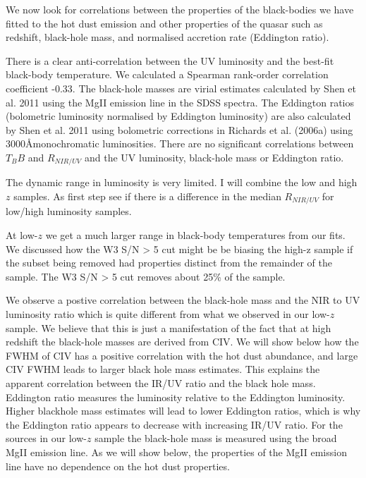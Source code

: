 We now look for correlations between the properties of the black-bodies we have fitted to the hot dust emission and other properties of the quasar such as redshift, black-hole mass, and normalised accretion rate (Eddington ratio). 

There is a clear anti-correlation between the UV luminosity and the best-fit black-body temperature. 
We calculated a Spearman rank-order correlation coefficient -0.33. 
The black-hole masses are virial estimates calculated by Shen et al. 2011 using the MgII emission line in the SDSS spectra. 
The Eddington ratios (bolometric luminosity normalised by Eddington luminosity) are also calculated by Shen et al. 2011 using bolometric corrections in Richards et al. (2006a) using 3000\AA monochromatic luminosities. 
There are no significant correlations between $T_BB$ and $R_{NIR/UV}$ and the UV luminosity, black-hole mass or Eddington ratio. 

The dynamic range in luminosity is very limited. 
I will combine the low and high $z$ samples. 
As first step see if there is a difference in the median $R_{NIR/UV}$ for low/high luminosity samples. 

At low-$z$  we get a much larger range in black-body temperatures from our fits. 
We discussed how the W3 S/N > 5 cut might be be biasing the high-z sample if the subset being removed had properties distinct from the remainder of the sample. 
The W3 S/N > 5 cut removes about 25\% of the sample. 

We observe a postive correlation between the black-hole mass and the NIR to UV luminosity ratio which is quite different from what we observed in our low-$z$ sample. 
We believe that this is just a manifestation of the fact that at high redshift the black-hole masses are derived from CIV. 
We will show below how the FWHM of CIV has a positive correlation with the hot dust abundance, and large CIV FWHM leads to larger black hole mass estimates. 
This explains the apparent correlation between the IR/UV ratio and the black hole mass. 
Eddington ratio measures the luminosity relative to the Eddington luminosity. 
Higher blackhole mass estimates will lead to lower Eddington ratios, which is why the Eddington ratio appears to decrease with increasing IR/UV ratio. 
For the sources in our low-$z$ sample the black-hole mass is measured using the broad MgII emission line. 
As we will show below, the properties of the MgII emission line have no dependence on the hot dust properties. 







